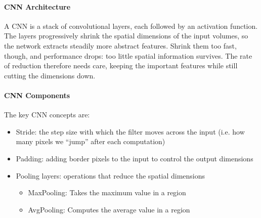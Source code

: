 \paragraph{CNN Architecture}

A CNN is a stack of convolutional layers, each followed by an activation function. The layers progressively shrink the spatial dimensions of the input volumes, so the network extracts steadily more abstract features. Shrink them too fast, though, and performance drops: too little spatial information survives. The rate of reduction therefore needs care, keeping the important features while still cutting the dimensions down.

\paragraph{CNN Components}
The key CNN concepts are:

\begin{itemize}
\item Stride: the step size with which the filter moves across the input (i.e. how many pixels we ``jump'' after each computation)
\item Padding: adding border pixels to the input to control the output dimensions
\item Pooling layers: operations that reduce the spatial dimensions
  \begin{itemize}
  \item MaxPooling: Takes the maximum value in a region
  \item AvgPooling: Computes the average value in a region
  \end{itemize}
\end{itemize}

